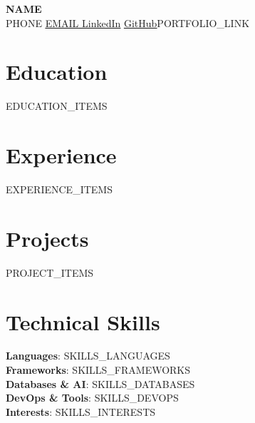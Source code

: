 \documentclass[letterpaper,11pt]{article}
\newcommand{\resumeSubHeadingListStart}{\begin{itemize}[leftmargin=0.15in, label={}]}
\newcommand{\resumeSubHeadingListEnd}{\end{itemize}}
\begin{document}
\begin{center}
    \textbf{\Huge \scshape {{NAME}}} \\ \vspace{2pt}
    \small {{PHONE}} \hspace{1pt}
    \href{mailto:{{EMAIL}}}{\underline{ {{EMAIL}} }} \hspace{1pt}
    \href{https://linkedin.com/in/{{LINKEDIN_HANDLE}}}{\underline{LinkedIn}} \hspace{1pt}
    \href{https://github.com/{{GITHUB_HANDLE}}}{\underline{GitHub}}{{PORTFOLIO_LINK}}
\end{center}

\section{Education}
  \resumeSubHeadingListStart
{{EDUCATION_ITEMS}}
  \resumeSubHeadingListEnd

\section{Experience}
  \resumeSubHeadingListStart
{{EXPERIENCE_ITEMS}}
  \resumeSubHeadingListEnd

\section{Projects}
    \resumeSubHeadingListStart
{{PROJECT_ITEMS}}
    \resumeSubHeadingListEnd

\section{Technical Skills}
 \begin{itemize}[leftmargin=0.15in, label={}]
    \small{\item{
     \textbf{Languages}{: {{SKILLS_LANGUAGES}}} \\
     \textbf{Frameworks}{: {{SKILLS_FRAMEWORKS}}} \\
     \textbf{Databases \& AI}{: {{SKILLS_DATABASES}}} \\
     \textbf{DevOps \& Tools}{: {{SKILLS_DEVOPS}}} \\
     \textbf{Interests}{: {{SKILLS_INTERESTS}}} \\
    }}
 \end{itemize}
\end{document}
